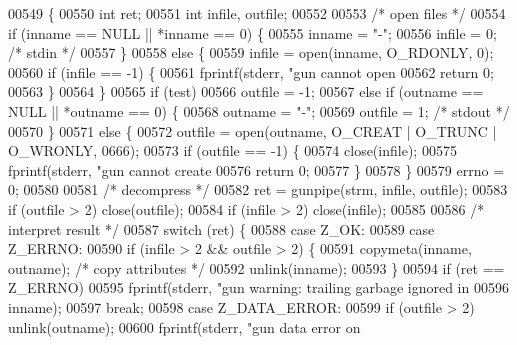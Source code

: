 \begin{DoxyCode}
00549 \{
00550     \textcolor{keywordtype}{int} ret;
00551     \textcolor{keywordtype}{int} infile, outfile;
00552 
00553     \textcolor{comment}{/* open files */}
00554     \textcolor{keywordflow}{if} (inname == NULL || *inname == 0) \{
00555         inname = \textcolor{stringliteral}{"-"};
00556         infile = 0;     \textcolor{comment}{/* stdin */}
00557     \}
00558     \textcolor{keywordflow}{else} \{
00559         infile = open(inname, O\_RDONLY, 0);
00560         \textcolor{keywordflow}{if} (infile == -1) \{
00561             fprintf(stderr, \textcolor{stringliteral}{"gun cannot open %
00562             \textcolor{keywordflow}{return} 0;
00563         \}
00564     \}
00565     \textcolor{keywordflow}{if} (test)
00566         outfile = -1;
00567     \textcolor{keywordflow}{else} \textcolor{keywordflow}{if} (outname == NULL || *outname == 0) \{
00568         outname = \textcolor{stringliteral}{"-"};
00569         outfile = 1;    \textcolor{comment}{/* stdout */}
00570     \}
00571     \textcolor{keywordflow}{else} \{
00572         outfile = open(outname, O\_CREAT | O\_TRUNC | O\_WRONLY, 0666);
00573         \textcolor{keywordflow}{if} (outfile == -1) \{
00574             close(infile);
00575             fprintf(stderr, \textcolor{stringliteral}{"gun cannot create %
00576             \textcolor{keywordflow}{return} 0;
00577         \}
00578     \}
00579     errno = 0;
00580 
00581     \textcolor{comment}{/* decompress */}
00582     ret = gunpipe(strm, infile, outfile);
00583     \textcolor{keywordflow}{if} (outfile > 2) close(outfile);
00584     \textcolor{keywordflow}{if} (infile > 2) close(infile);
00585 
00586     \textcolor{comment}{/* interpret result */}
00587     \textcolor{keywordflow}{switch} (ret) \{
00588     \textcolor{keywordflow}{case} Z\_OK:
00589     \textcolor{keywordflow}{case} Z\_ERRNO:
00590         \textcolor{keywordflow}{if} (infile > 2 && outfile > 2) \{
00591             copymeta(inname, outname);          \textcolor{comment}{/* copy attributes */}
00592             unlink(inname);
00593         \}
00594         \textcolor{keywordflow}{if} (ret == Z\_ERRNO)
00595             fprintf(stderr, \textcolor{stringliteral}{"gun warning: trailing garbage ignored in %
00596                     inname);
00597         \textcolor{keywordflow}{break};
00598     \textcolor{keywordflow}{case} Z\_DATA\_ERROR:
00599         \textcolor{keywordflow}{if} (outfile > 2) unlink(outname);
00600         fprintf(stderr, \textcolor{stringliteral}{"gun data error on %
}}}}
\end{DoxyCode}
